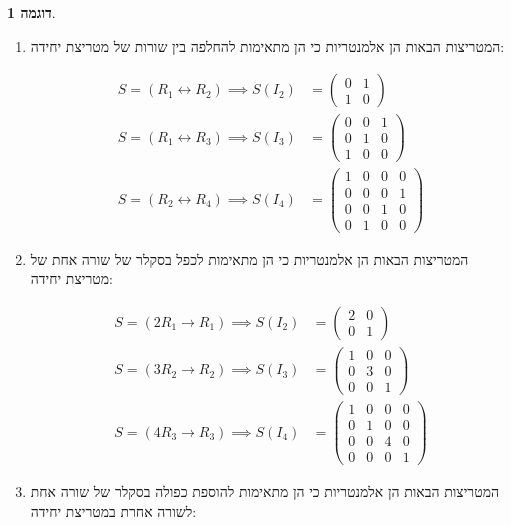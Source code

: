 \documentclass[12pt]{report}
\theoremstyle{plain}
\theoremstyle{definition}
\newtheorem{example}{דוגמה}[chapter]
\newcommand{\0}{\mathbf{0}}
\begin{document}
\begin{example}\
\begin{enumerate}[label=\alph*.]
\item 
המטריצות הבאות הן אלמנטריות כי הן מתאימות להחלפה בין שורות של מטריצת יחידה:

$$
\begin{aligned}
S=(R_1\leftrightarrow R_2) \implies S(I_2)&=\begin{pmatrix}
0 &1 \\
1 & 0
\end{pmatrix} \\
S=(R_1\leftrightarrow R_3)\implies S(I_3)&=\begin{pmatrix}
0 &0 &1 \\
0 & 1 &0 \\
1 &0 &0
\end{pmatrix} \\
S=(R_2\leftrightarrow R_4) \implies S(I_4)&=\begin{pmatrix}
1 &0 &0 &0 \\
0 & 0 &0 &1 \\
0 &0 &1 &0 \\
0 &1 &0 &0
\end{pmatrix}
\end{aligned}
$$


\item 
המטריצות הבאות הן אלמנטריות כי הן מתאימות לכפל בסקלר של שורה אחת של מטריצת יחידה:

$$
\begin{aligned}
S=(2R_1\to R_1)\implies S(I_2)&=\begin{pmatrix}
2 & 0\\
0 & 1
\end{pmatrix} \\
S=(3R_2\to R_2)\implies S(I_3)&=\begin{pmatrix}
1 &0 &0 \\
0 & 3 &0 \\
0 &0 &1
\end{pmatrix} \\
S=(4R_3\to R_3)\implies S(I_4)&=\begin{pmatrix}
1 &0 &0 &0 \\
0 & 1 &0 &0 \\
0 &0 &4 &0 \\
0 &0 &0 &1
\end{pmatrix}
\end{aligned}
$$


\item 
המטריצות הבאות הן אלמנטריות כי הן מתאימות להוספת כפולה בסקלר של שורה אחת לשורה אחרת במטריצת יחידה:


\end{enumerate}
\end{example}
\end{document}
